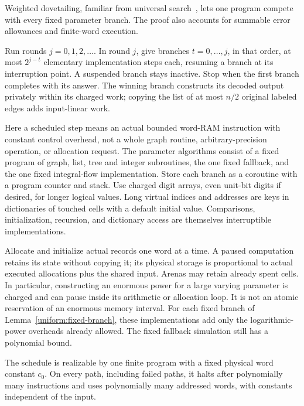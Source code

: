 Weighted dovetailing, familiar from universal
search~\cite{LevinUniversal}, lets one program compete with every fixed
parameter branch. The proof also accounts for summable error allowances
and finite-word execution.

Run rounds $j=0,1,2,\ldots$. In round $j$, give branches
$t=0,\ldots,j$, in that order, at most $2^{j-t}$ elementary implementation
steps each, resuming a branch at its interruption point. A suspended branch
stays inactive. Stop when the first branch completes with its answer.
The winning branch constructs its decoded output privately within its
charged work; copying the list of at most $n/2$ original labeled edges
adds input-linear work.

Here a scheduled step means an actual bounded word-RAM instruction with
constant control overhead, not a whole graph routine, arbitrary-precision
operation, or allocation request. The parameter algorithms consist of a
fixed program of graph, list, tree and integer subroutines, the one fixed
fallback, and the one fixed integral-flow implementation. Store each
branch as a coroutine with a program counter and stack. Use charged
digit arrays, even unit-bit digits if desired, for longer logical values.
Long virtual indices and addresses are keys in dictionaries of touched
cells with a default initial value. Comparisons, initialization, recursion,
and dictionary access are themselves interruptible implementations.

Allocate and initialize actual records one word at a time. A paused
computation retains its state without copying it; its physical storage
is proportional to actual executed allocations plus the shared input.
Arenas may retain already spent cells. In particular, constructing an
enormous power for a large varying parameter is charged and can pause
inside its arithmetic or allocation loop. It is not an atomic reservation
of an enormous memory interval. For each fixed branch of
Lemma~\ref{uniform:fixed-branch}, these implementations add only the
logarithmic-power overheads already allowed. The fixed fallback simulation
still has a polynomial bound.

\begin{lemma}\label{uniform:physical-ram}
The schedule is realizable by one finite program with a fixed physical word
constant $c_0$. On every path, including failed paths, it halts after
polynomially many instructions and uses polynomially many addressed words,
with constants independent of the input.
\end{lemma}

